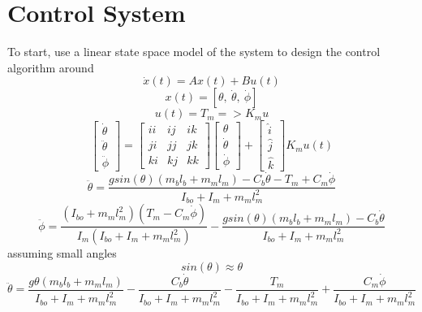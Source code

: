 \documentclass[12pt]{article}
\begin{document}
	\section{Control System}
		To start, use a linear state space model of the system to design the control algorithm around
		\begin{equation}
			\dot x(t) = Ax(t) + Bu(t)
		\end{equation}
		\begin{equation}
			x(t) = [\theta,\ \dot\theta,\ \dot\phi]
		\end{equation}
		\begin{equation}
			u(t) = T_m => K_mu
		\end{equation}
		\begin{equation}
			\begin{bmatrix}
				\dot\theta \\ \ddot\theta \\ \ddot\phi 
			\end{bmatrix}
			=
			\begin{bmatrix}
				ii & ij & ik \\ ji & jj & jk \\ ki & kj & kk
			\end{bmatrix}
			\begin{bmatrix}
				\theta \\ \dot\theta \\ \dot\phi
			\end{bmatrix}
			+
			\begin{bmatrix}
				\hat{i} \\ \hat{j} \\ \hat{k}
			\end{bmatrix}
			K_mu(t)
		\end{equation}
		\begin{equation}
			\ddot\theta = \frac{gsin(\theta)(m_bl_b + m_ml_m) - C_b \dot\theta - T_m + C_m \dot\phi}{I_{bo}+I_m+m_ml_m^2}
		\end{equation}
		\begin{equation}
			\ddot\phi = \frac{(I_{bo}+m_ml_m^2)(T_m-C_m\dot\phi)}{I_m(I_{bo}+I_m+m_ml_m^2)} - \frac{gsin(\theta)(m_bl_b+m_ml_m)-C_b\dot\theta}{I_{bo}+I_m+m_ml_m^2}
		\end{equation}
		assuming small angles
		\begin{equation}
			sin(\theta) \approx \theta
		\end{equation}
		\begin{equation}
			\ddot\theta = \frac{g\theta(m_bl_b + m_ml_m)}{I_{bo}+I_m+m_ml_m^2} - \frac{C_b \dot\theta}{I_{bo}+I_m+m_ml_m^2} - \frac{T_m}{I_{bo}+I_m+m_ml_m^2} + \frac{C_m \dot\phi}{I_{bo}+I_m+m_ml_m^2}
		\end{equation}
\end{document}

